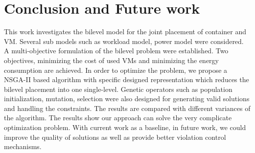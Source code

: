 \section{Conclusion and Future work}
\label{sec:con}

This work investigates the bilevel model for the joint placement of container and VM. Several sub models such as workload model, power model were considered. A multi-objective formulation of the bilevel problem were established. Two objectives, minimizing the cost of used VMs and minimizing the energy consumption are achieved. In order to optimize the problem, we propose a NSGA-II based algorithm with specific designed representation which reduces the bilevel placement into one single-level. Genetic operators such as population initialization, mutation, selection were also designed for generating valid solutions and handling the constraints. The results are compared with different variances of the algorithm. The results show our approach can solve the very complicate optimization problem. With current work as a baseline, in future work, we could improve the quality of solutions as well as provide better violation control mechanisms.

